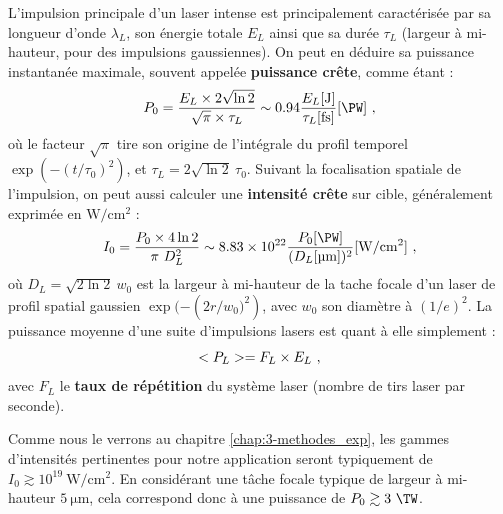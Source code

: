 \begin{refsection}
L'impulsion principale d'un laser intense est principalement caractérisée par sa longueur d'onde $\lambda_L$, son énergie totale $E_L$ ainsi que sa durée $\tau_{L}$ (largeur à mi-hauteur, pour des impulsions gaussiennes). On peut en déduire sa puissance instantanée maximale, souvent appelée \textbf{puissance crête}, comme étant :
\begin{equation}
    P_0 = \dfrac{E_L \times 2 \sqrt{\ln{2}}}{\sqrt{\pi} \times  \tau_{L}} \sim 0.94 \dfrac{E_L \si{[\J]}}{\tau_{L}\si{[\fs]}} \si{[\PW]} ~ \rm ,
    \label{eq:2-puissance_laser}
\end{equation}
où le facteur $\sqrt{\pi}$ tire son origine de l'intégrale du profil temporel $\exp\left(-(t/\tau_0)^2\right)$, et $\tau_L = 2 \sqrt{\ln 2} ~ \tau_0$. Suivant la focalisation spatiale de l'impulsion, on peut aussi calculer une \textbf{intensité crête} sur cible, généralement exprimée en $\si{\W \per \cm^2}$ :
\begin{equation}
    I_0=\dfrac{P_0 \times 4 \ln 2}{\pi ~ D_L^2} \sim 8.83 \times 10^{22} \dfrac{P_0\si{[\PW]}}{(D_{L}\si{[\um]})^2} \si{[\W\per\cm^2]}~ \rm ,
\end{equation}
où $D_L=\sqrt{2\ln{2}} ~ w_0$ est la largeur à mi-hauteur de la tache focale d'un laser de profil spatial gaussien $\exp(-\left(2 r/w_0)^2\right)$, avec $w_0$ son diamètre à $(1/e)^2$. La puissance moyenne d'une suite d'impulsions lasers est quant à elle simplement :
\begin{equation}
    <P_L> = F_L \times E_L ~ \rm ,
\end{equation}
avec $F_L$ le \textbf{taux de répétition} du système laser (nombre de tirs laser par seconde).

Comme nous le verrons au chapitre \ref{chap:3-methodes_exp}, les gammes d'intensités pertinentes pour notre application seront typiquement de $I_0 \gtrsim 10^{19} ~ \si{\W \per \cm^2}$. En considérant une tâche focale typique de largeur à mi-hauteur $5 ~ \si{\um}$, cela correspond donc à une puissance de $P_0 \gtrsim 3 ~ \si{\TW}$.


\end{refsection}
